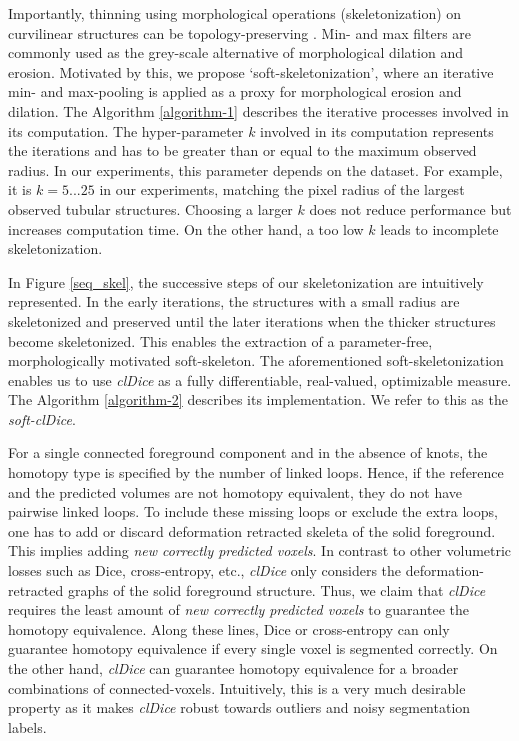 Importantly, thinning using morphological operations (skeletonization) on curvilinear structures can be topology-preserving \cite{palagyi20023}. Min- and max filters are commonly used as the grey-scale alternative of morphological dilation and erosion. Motivated by this, we propose `soft-skeletonization', where an iterative min- and max-pooling is applied as a proxy for morphological erosion and dilation. The Algorithm \ref{algorithm-1} describes the iterative processes involved in its computation. The hyper-parameter $k$ involved in its computation represents the iterations and has to be greater than or equal to the maximum observed radius. In our experiments, this parameter depends on the dataset. For example, it is  $k=5...25$ in our experiments, matching the pixel radius of the largest observed tubular structures. Choosing a larger $k$ does not reduce performance but increases computation time. On the other hand, a too low $k$ leads to incomplete skeletonization. 


In Figure \ref{seq_skel}, the successive steps of our skeletonization are intuitively represented. In the early iterations, the structures with a small radius are skeletonized and preserved until the later iterations when the thicker structures become skeletonized. This enables the extraction of a parameter-free, morphologically motivated soft-skeleton. The aforementioned soft-skeletonization enables us to use \textit{clDice} as a fully differentiable, real-valued, optimizable measure. The Algorithm \ref{algorithm-2} describes its implementation. We refer to this as the \textit{soft-clDice}.

For a single connected foreground component and in the absence of knots, the homotopy type is specified by the number of linked loops. Hence, if the reference and the predicted volumes are not homotopy equivalent, they do not have pairwise linked loops. To include these missing loops or exclude the extra loops, one has to add or discard deformation retracted skeleta of the solid foreground. This implies adding \textit{new correctly predicted voxels}. In contrast to other volumetric losses such as Dice, cross-entropy, etc., \textit{clDice} only considers the deformation-retracted graphs of the solid foreground structure. Thus, we claim that \textit{clDice} requires the least amount of \textit{new correctly predicted voxels} to guarantee the homotopy equivalence. Along these lines, Dice or cross-entropy can only guarantee homotopy equivalence if every single voxel is segmented correctly. On the other hand, \textit{clDice} can guarantee homotopy equivalence for a broader combinations of connected-voxels. Intuitively, this is a very much desirable property as it makes \textit{clDice} robust towards outliers and noisy segmentation labels.


